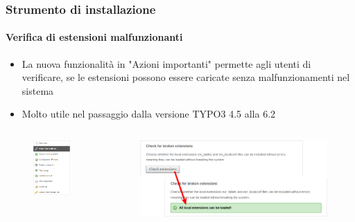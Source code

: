 \begin{frame}[fragile]
	\frametitle{Strumento di installazione}
	\framesubtitle{Verifica di estensioni malfunzionanti}

	\begin{itemize}
		\item La nuova funzionalità in "Azioni importanti" permette agli utenti di verificare,
			se le estensioni possono essere caricate senza malfunzionamenti nel sistema
		\item Molto utile nel passaggio dalla versione TYPO3 4.5 alla 6.2
	\end{itemize}

	\begin{columns}[T]
		\begin{column}{.3\textwidth}
			\begin{figure}\vspace*{-0.4cm}
				\includegraphics[width=0.7\linewidth]{Images/InstallTool/ImportantActions.png}
			\end{figure}
		\end{column}
		\begin{column}{.7\textwidth}
			\begin{figure}\vspace*{-0.4cm}
				\includegraphics[width=1\linewidth]{Images/InstallTool/CheckForBrokenExtensions.png}

\end{figure}
\end{column}
\end{columns}
\end{frame}
